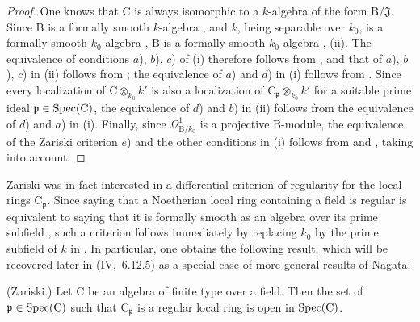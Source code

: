 \begin{proof}
One knows that $\mathrm{C}$ is always isomorphic to a $k$-algebra of the form
$\mathrm{B}/\mathfrak{J}$. Since $\mathrm{B}$ is a formally smooth
$k$-algebra , and $k$, being separable over $k_0$, is a
formally smooth $k_0$-algebra , $\mathrm{B}$ is a formally
smooth $k_0$-algebra , (ii). The equivalence of conditions
$a$), $b$), $c$) of (i) therefore follows from , and that of
$a$), $b$), $c$) in (ii) follows from ; the equivalence of
$a$) and $d$) in (i) follows from . Since every localization
of $\mathrm{C}\otimes_{k_0}k'$ is also a localization of
$\mathrm{C}_\mathfrak{p}\otimes_{k_0}k'$ for a suitable prime ideal
$\mathfrak{p}\in\operatorname{Spec}(\mathrm{C})$, the equivalence of $d$) and $b$) in (ii)
follows from the equivalence of $d$) and $a$) in (i). Finally, since
$\Omega^1_{\mathrm{B}/k_0}$ is a projective $\mathrm{B}$-module, the
equivalence of the Zariski criterion $e$) and the other conditions in (i)
follows from  and , taking
 into account.
\end{proof}

Zariski was in fact interested in a differential criterion of regularity for
the local rings $\mathrm{C}_\mathfrak{p}$. Since saying that a Noetherian
local ring containing a field is regular is equivalent to saying that it is
formally smooth as an algebra over its prime subfield , such a
criterion follows immediately by replacing $k_0$ by the prime subfield of
$k$ in . In particular, one obtains the following result,
which will be recovered later in (IV,~6.12.5) as a special case of more
general results of Nagata:

\begin{corollary}[22.6.8]
\label{0.22.6.8}
\textnormal{(Zariski.)}
Let $\mathrm{C}$ be an algebra of finite type over a field.
Then the set of $\mathfrak{p}\in\operatorname{Spec}(\mathrm{C})$ such that $\mathrm{C}_\mathfrak{p}$ is a regular local ring is open in $\operatorname{Spec}(\mathrm{C})$.
\end{corollary}

